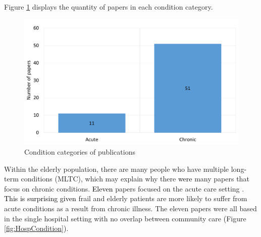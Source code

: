 \documentclass[../thesis.tex]{subfiles}
\begin{document}
Figure \ref{fig:Condition} displays the quantity of papers in each condition category.

\begin{figure}[h!]
\centering
  \includegraphics[scale=0.3]{Chapter2/Figures/AcuteChronic.pdf} 
  \caption{Condition categories of publications}
  \label{fig:Condition}
\end{figure} 

Within the elderly population, there are many people who have multiple long\textcolor{black}{-}term conditions (MLTC), which may explain why there \textcolor{black}{were} many papers that focus on chronic conditions. \textcolor{black}{Eleven} papers focused on the acute care setting \cite{Abe, Azad, Franklin, Kul, Onggo, Rashwan, Rossille, Shaw, Silvester, Trevisan, Wallace}. %
\textcolor{black}{This is surprising given }%
frail and elderly patients are more likely to suffer from acute conditions as a result from chronic illness.
The eleven papers were all based in the single hospital setting with no overlap between community care \textcolor{black}{(}Figure \ref{fig:HospCondition}\textcolor{black}{)}.
\end{document}
